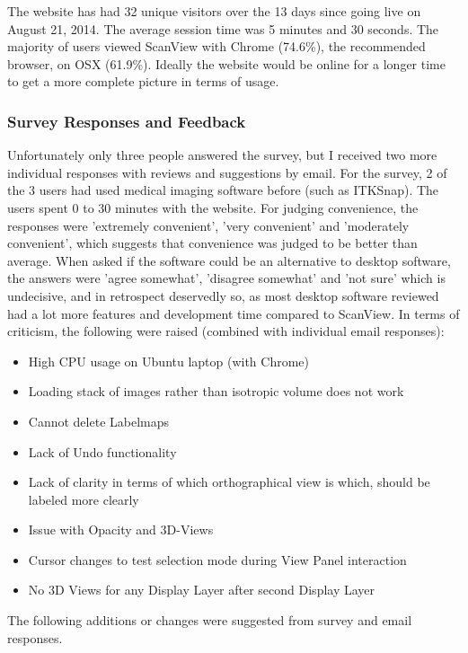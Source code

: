 \documentclass[a4paper,11pt,twoside]{article}
\begin{document}
The website has had 32 unique visitors over the 13 days since going live on August 21, 2014. The average session time was 5 minutes and 30 seconds. The majority of users viewed ScanView with Chrome (74.6\%), the recommended browser, on OSX (61.9\%). Ideally the 
website would be online for a longer time to get a more complete picture in terms of usage. 

\subsubsection{Survey Responses and Feedback}

Unfortunately only three people answered the survey, but I received two more individual responses with reviews and suggestions by email.
For the survey, 2 of the 3 users had used medical imaging software before (such as ITKSnap). The users spent 0 to 30 minutes with the website. For judging convenience, the responses were 'extremely convenient', 'very convenient' and 'moderately convenient', which suggests that convenience was judged to be better than average. When asked if the software could be an alternative to desktop software, the answers were 'agree somewhat', 'disagree somewhat' and 'not sure' which is undecisive, and in retrospect deservedly so, as most desktop software reviewed had a lot more features and development time compared to ScanView. In terms of criticism, the following were raised (combined with individual email responses):

\begin{itemize}
\item High CPU usage on Ubuntu laptop (with Chrome)
\item Loading stack of images rather than isotropic volume does not work
\item Cannot delete Labelmaps
\item Lack of Undo functionality
\item Lack of clarity in terms of which orthographical view is which, should be labeled more clearly
\item Issue with Opacity and 3D-Views
\item Cursor changes to test selection mode during View Panel interaction
\item No 3D Views for any Display Layer after second Display Layer
\end{itemize}


The following additions or changes were suggested from survey and email responses.
\end{document}
